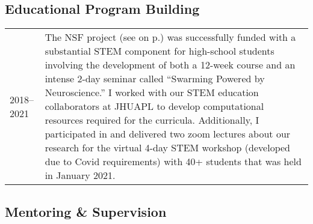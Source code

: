 \documentclass[10pt]{article}
\begin{document}
\subsection*{Educational Program Building}
\label{sec:eduprogram}

\begin{tabular}{@{\hspace{0.2in}}l>{\raggedright\arraybackslash}p{}}
  2018--2021 \hspace{0.1in} & The NSF project (see
  \emph{\nameref{sec:funding}} on p.\pageref{sec:funding}) was
  successfully funded with a substantial STEM component for high-school students
  involving the development of both a 12-week course and an intense 2-day
  seminar called ``Swarming Powered by Neuroscience.'' I worked with our STEM
  education collaborators at JHUAPL to develop computational resources required
  for the curricula. Additionally, I participated in and delivered two zoom
  lectures about our research for the virtual 4-day STEM workshop (developed due
  to Covid requirements) with 40+ students that was held in January 2021.
\end{tabular}

\subsection*{Mentoring \& Supervision}
\label{sec:mentoring}
\end{document}
